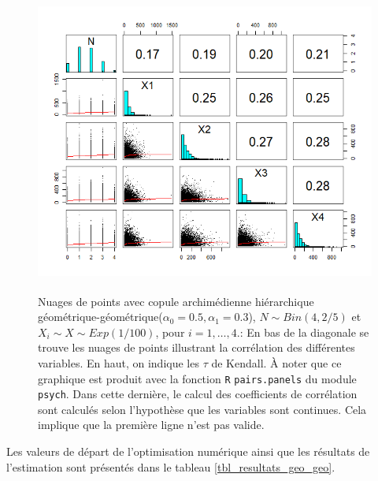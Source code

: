 \documentclass{article}
\begin{document}
		\begin{figure}[H]
			\centering
			\includegraphics[height=10cm]{Graph/scatterplot_geo_geo.png}
			\caption[Nuages de points du scénario \ref{scenario_geo_geo}]
			{Nuages de points avec copule archimédienne hiérarchique géométrique-géométrique($\alpha_0=0.5, \alpha_1 = 0.3$), $N \sim Bin(4, 2/5)$ et $X_i \sim X \sim Exp(1/100)$, pour $i=1,\dots, 4$.:
				En bas de la diagonale se trouve les nuages de points illustrant la corrélation des différentes variables. En haut, on indique les $\tau$ de Kendall. À noter que ce graphique est produit avec la fonction \texttt{R} \texttt{pairs.panels} du module \texttt{psych}. Dans cette dernière, le calcul des coefficients de corrélation sont calculés selon l'hypothèse que les variables sont continues. Cela implique que la première ligne n'est pas valide.}
			\label{graph_scatterplot_geo_geo}
		\end{figure}
	
		Les valeurs de départ de l'optimisation numérique ainsi que les résultats de l'estimation sont présentés dans le tableau \ref{tbl_resultats_geo_geo}.
		
\end{document}
